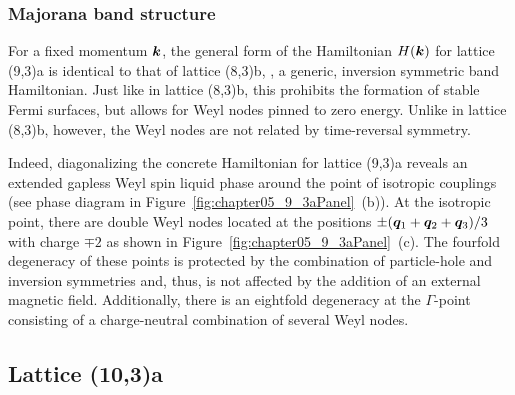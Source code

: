 %
%
\subsubsection{Majorana band structure}
%
%
For a fixed momentum $\bm{k}$, the general form of the Hamiltonian $H(\bm{k})$ for lattice (9,3)a is identical to that of lattice (8,3)b, \ie, a generic, inversion symmetric band Hamiltonian.
Just like in lattice (8,3)b, this prohibits the formation of stable Fermi surfaces, but allows for Weyl nodes pinned to zero energy.
Unlike in lattice (8,3)b, however, the Weyl nodes are not related by time-reversal symmetry.

Indeed, diagonalizing the concrete Hamiltonian for lattice (9,3)a reveals an extended gapless Weyl spin liquid phase around the point of isotropic couplings (see phase diagram in Figure~\ref{fig:chapter05_9_3aPanel}~(b)).
At the isotropic point, there are double Weyl nodes located at the positions $\pm(\bm{q}_1 + \bm{q}_2 + \bm{q}_3)/3$ with charge $\mp 2$ as shown in Figure~\ref{fig:chapter05_9_3aPanel}~(c).
The fourfold degeneracy of these points is protected by the combination of particle-hole and inversion symmetries and, thus, is not affected by the addition of an external magnetic field.
Additionally, there is an eightfold degeneracy at the $\Gamma$-point consisting of a charge-neutral combination of several Weyl nodes.


%
%
\subsection{Lattice (10,3)a}
\label{section:chapter05_10_3a}
%
%
